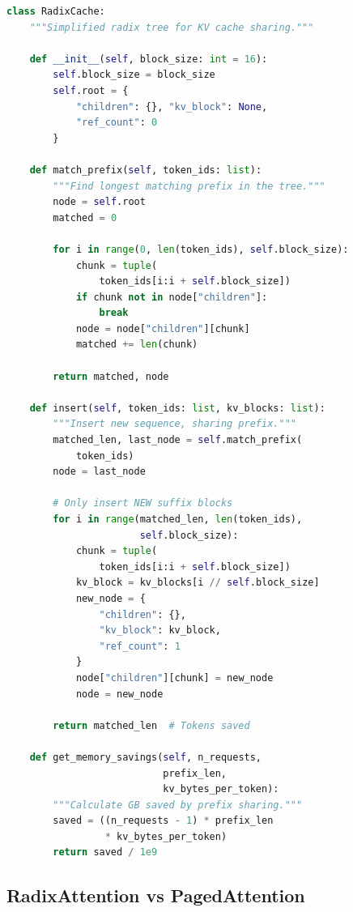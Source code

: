 \documentclass[11pt,a4paper]{article}
\begin{document}
\begin{lstlisting}[language=Python, caption={Simplified Radix Tree for KV Cache Sharing}]
class RadixCache:
    """Simplified radix tree for KV cache sharing."""
    
    def __init__(self, block_size: int = 16):
        self.block_size = block_size
        self.root = {
            "children": {}, "kv_block": None, 
            "ref_count": 0
        }
    
    def match_prefix(self, token_ids: list):
        """Find longest matching prefix in the tree."""
        node = self.root
        matched = 0
        
        for i in range(0, len(token_ids), self.block_size):
            chunk = tuple(
                token_ids[i:i + self.block_size])
            if chunk not in node["children"]:
                break
            node = node["children"][chunk]
            matched += len(chunk)
        
        return matched, node
    
    def insert(self, token_ids: list, kv_blocks: list):
        """Insert new sequence, sharing prefix."""
        matched_len, last_node = self.match_prefix(
            token_ids)
        node = last_node
        
        # Only insert NEW suffix blocks
        for i in range(matched_len, len(token_ids), 
                       self.block_size):
            chunk = tuple(
                token_ids[i:i + self.block_size])
            kv_block = kv_blocks[i // self.block_size]
            new_node = {
                "children": {},
                "kv_block": kv_block,
                "ref_count": 1
            }
            node["children"][chunk] = new_node
            node = new_node
        
        return matched_len  # Tokens saved

    def get_memory_savings(self, n_requests, 
                           prefix_len, 
                           kv_bytes_per_token):
        """Calculate GB saved by prefix sharing."""
        saved = ((n_requests - 1) * prefix_len 
                 * kv_bytes_per_token)
        return saved / 1e9
\end{lstlisting}

\subsection{RadixAttention vs PagedAttention}
\end{document}
